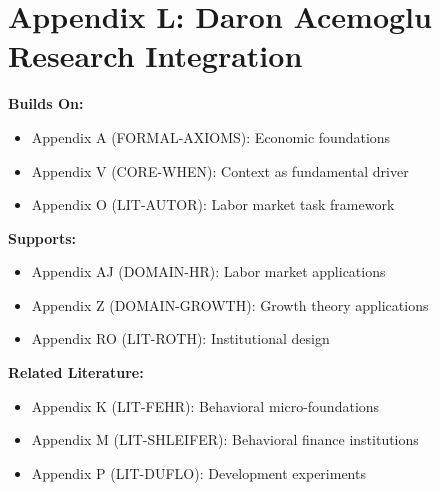 
\chapter*{Appendix L: Daron Acemoglu Research Integration}
\label{app:acemoglu}

\begin{tcolorbox}[colback=blue!5!white,colframe=blue!75!black,title=Cross-Reference Map]
\textbf{Builds On:}
\begin{itemize}
    \item Appendix A (FORMAL-AXIOMS): Economic foundations
    \item Appendix V (CORE-WHEN): Context as fundamental driver
    \item Appendix O (LIT-AUTOR): Labor market task framework
\end{itemize}

\textbf{Supports:}
\begin{itemize}
    \item Appendix AJ (DOMAIN-HR): Labor market applications
    \item Appendix Z (DOMAIN-GROWTH): Growth theory applications
    \item Appendix RO (LIT-ROTH): Institutional design
\end{itemize}

\textbf{Related Literature:}
\begin{itemize}
    \item Appendix K (LIT-FEHR): Behavioral micro-foundations
    \item Appendix M (LIT-SHLEIFER): Behavioral finance institutions
    \item Appendix P (LIT-DUFLO): Development experiments
\end{itemize}
\end{tcolorbox}

